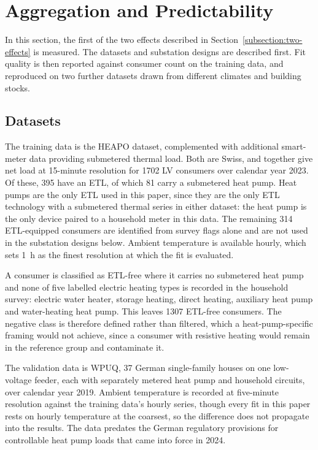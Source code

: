\documentclass[9pt,journal,a4]{IEEEtran}
\begin{document}
\section{Aggregation and Predictability}
\label{section:aggregation}
In this section, the first of the two effects described in Section~\ref{subsection:two-effects} is measured. The datasets and substation designs are described first. Fit quality is then reported against consumer count on the training data, and reproduced on two further datasets drawn from different climates and building stocks.


\subsection{Datasets}
\label{subsection:data}

The training data is the HEAPO dataset, complemented with additional smart-meter data providing submetered thermal load. Both are Swiss, and together give net load at 15-minute resolution for 1702 LV consumers over calendar year 2023. Of these, 395 have an ETL, of which 81 carry a submetered heat pump. Heat pumps are the only ETL used in this paper, since they are the only ETL technology with a submetered thermal series in either dataset: the heat pump is the only device paired to a household meter in this data. The remaining 314 ETL-equipped consumers are identified from survey flags alone and are not used in the substation designs below. Ambient temperature is available hourly, which sets 1~h as the finest resolution at which the fit is evaluated.

A consumer is classified as ETL-free where it carries no submetered heat pump and none of five labelled electric heating types is recorded in the household survey: electric water heater, storage heating, direct heating, auxiliary heat pump and water-heating heat pump. This leaves 1307 ETL-free consumers. The negative class is therefore defined rather than filtered, which a heat-pump-specific framing would not achieve, since a consumer with resistive heating would remain in the reference group and contaminate it.

The validation data is WPUQ, 37 German single-family houses on one low-voltage feeder, each with separately metered heat pump and household circuits, over calendar year 2019. Ambient temperature is recorded at five-minute resolution against the training data's hourly series, though every fit in this paper rests on hourly temperature at the coarsest, so the difference does not propagate into the results. The data predates the German regulatory provisions for controllable heat pump loads that came into force in 2024.
\end{document}

